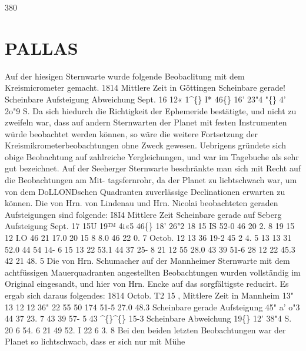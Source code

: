 \documentclass[12pt,a4paper]{article}
\newcommand{\degree}{\textdegree}
\begin{document}
\newpage
380 

\section*{PALLAS}
Auf  der  hiesigen  Sternwarte  wurde  folgende  Beobaclitung  mit  dem  Kreismicrometer  gemacht. 
1814 
Mittlere  Zeit 
in  Göttingen 
Scheinbare  gerade!      Scheinbare 
Aufsteigung  Abweichung 
Sept.  16  12«    1\textasciicircum\{\}    I*         46\degree\{\}    16'    23"4         "\degree\{\}   4'    2o"9  S. 
Da  sich  hiedurch  die  Richtigkeit  der  Ephemeride  bestätigte,  und  nicht  zu  zweifeln  war,  dass  auf 
andern  Sternwarten  der  Planet  mit  festen  Instrumenten  würde  beobachtet  werden  können,  so  wäre  die 
weitere  Fortsetzung  der  Kreismikrometerbeobachtungen  ohne  Zweck  gewesen.  Uebrigens  gründete  sich 
obige  Beobachtung  auf  zahlreiche  Yergleichungen,  und  war  im  Tagebuche  als  sehr  gut  bezeichnet. 
Auf  der  Seeherger  Sternwarte  beschränkte  man  sich  mit  Recht  auf  die  Beobachtungen  am  Mit- 
tagsfernrohr, da  der  Planet  zu  licbtschwach  war,  um  von  dem  DoLLONDschen  Quadranten  zuverlässige 
Declinationen  erwarten  zu  können.  Die  von  Hrn.  von  Lindenau  und  Hrn.  Nicolai  beobachteten  geraden 
Aufsteigungen  sind  folgende: 
I8I4 
Mittlere  Zeit 
Scheinbare  gerade 
auf  Seberg 
Aufsteigung 
Sept.    17 
15U  19™  4i«5 
46\degree\{\}     18'      26"2 
18 
15    IS    52-0 
46     20      2. 8 
19 
15       12        I.O 
46     21     17.0 
20 
15       8       8.0 
46     22      0. 7 
Octob. 12 
13     36     19-2 
45       2      4. 5 
13 
13     31     52.0 
44     54     14-  6 
15 
13     22     53.1 
44     37     25-  8 
21 
12     55     28.0 
43     39     51-6 
28 
12     22     45.3 
42     21     48. 5 
Die  von  Hrn.  Schumacher  auf  der  Mannheimer  Sternwarte  mit  dem  achtfüssigen  Mauerquadranten 
angestellten  Beobachtungen  wurden  vollständig  im  Original  eingesandt,  und  hier  von  Hrn.  Encke  auf 
das  sorgfältigste  reducirt.     Es  ergab  sich  daraus  folgendes: 
1814 
Octob.  T2 
15 
,  Mittlere  Zeit 
in  Mannheim 
13" 
13 
12 
12 
36" 
22 
55 
50 
174 
51-5 
27.0 
48.3 
Scheinbare  gerade 
Aufsteigung 
45"  a'  o"3 
44  37  23. 7 
43  39  57- 5 
43  \textasciicircum\{\}\textasciicircum\{\}  15-3 
Scheinbare 
Abweichung 
19\degree\{\}  12'  38"4  S. 
20  6  54. 6 
21  49  52.  I 
22  6  3. 8 
Bei  den  beiden  letzten  Beobachtungen  war  der  Planet  so  lichtschwacb,  dass  er  sich  nur  mit  Mühe 
\end{document}
